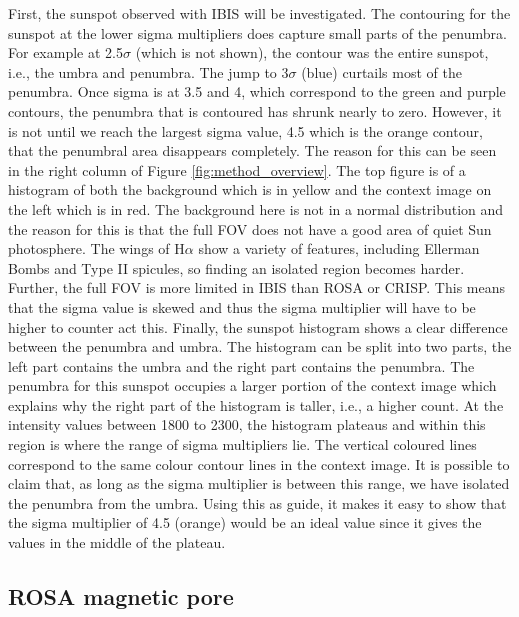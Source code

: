     First, the sunspot observed with IBIS will be investigated.
    The contouring for the sunspot at the lower sigma multipliers does capture small parts of the penumbra.
    For example at 2.5$\sigma$ (which is not shown), the contour was the entire sunspot, i.e., the umbra and penumbra.
    The jump to 3$\sigma$ (blue) curtails most of the penumbra.
    Once sigma is at 3.5 and 4, which correspond to the green and purple contours, the penumbra that is contoured has shrunk nearly to zero.
    However, it is not until we reach the largest sigma value, 4.5 which is the orange contour, that the penumbral area disappears completely.
    The reason for this can be seen in the right column of Figure \ref{fig:method_overview}.
    The top figure is of a histogram of both the background which is in yellow and the context image on the left which is in red.
    The background here is not in a normal distribution and the reason for this is that the full FOV does not have a good area of quiet Sun photosphere.
    The wings of H$\alpha$ show a variety of features, including Ellerman Bombs and Type II spicules, so finding an isolated region becomes harder.
    Further, the full FOV is more limited in IBIS than ROSA or CRISP. 
    This means that the sigma value is skewed and thus the sigma multiplier will have to be higher to counter act this.
    Finally, the sunspot histogram shows a clear difference between the penumbra and umbra.
    The histogram can be split into two parts, the left part contains the umbra and the right part contains the penumbra.
    The penumbra for this sunspot occupies a larger portion of the context image which explains why the right part of the histogram is taller, i.e., a higher count.
    At the intensity values between 1800 to 2300, the histogram plateaus and within this region is where the range of sigma multipliers lie. 
    The vertical coloured lines correspond to the same colour contour lines in the context image.
    It is possible to claim that, as long as the sigma multiplier is between this range, we have isolated the penumbra from the umbra.
    Using this as guide, it makes it easy to show that the sigma multiplier of 4.5 (orange) would be an ideal value since it gives the values in the middle of the plateau.
    
    \subsection{ROSA magnetic pore}
        
